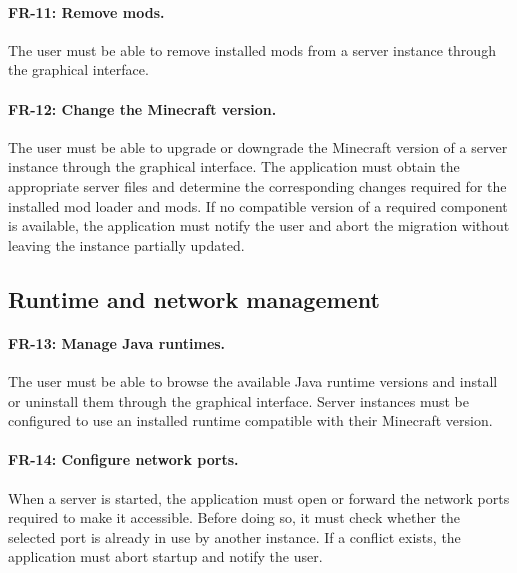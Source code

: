\paragraph{FR-11: Remove mods.} The user must be able to remove installed mods from a server instance through the graphical interface.

\paragraph{FR-12: Change the Minecraft version.} The user must be able to upgrade or downgrade the Minecraft version of a server instance through the graphical interface. The application must obtain the appropriate server files and determine the corresponding changes required for the installed mod loader and mods. If no compatible version of a required component is available, the application must notify the user and abort the migration without leaving the instance partially updated.

\subsection{Runtime and network management}

\paragraph{FR-13: Manage Java runtimes.} The user must be able to browse the available Java runtime versions and install or uninstall them through the graphical interface. Server instances must be configured to use an installed runtime compatible with their Minecraft version.

\paragraph{FR-14: Configure network ports.} When a server is started, the application must open or forward the network ports required to make it accessible. Before doing so, it must check whether the selected port is already in use by another instance. If a conflict exists, the application must abort startup and notify the user.
